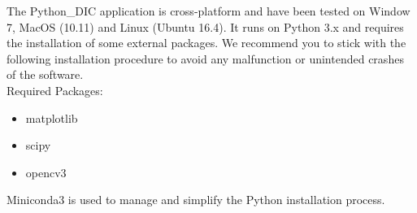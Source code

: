 \indent\indent The Python\_DIC application is cross-platform and have been tested on Window 7, MacOS (10.11) and Linux (Ubuntu 16.4). It runs on Python 3.x and requires the installation of some external packages. We recommend you to stick with the following installation procedure to avoid any malfunction or unintended crashes of the software.\\
\newline Required Packages:
\begin{itemize}
  \item matplotlib
  \item scipy
  \item opencv3
\end{itemize}
\newline
Miniconda3 is used to manage and simplify the Python installation process.
